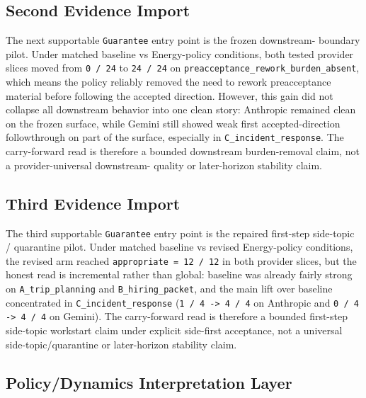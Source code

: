 \documentclass[11pt]{article}
\begin{document}
\subsection{Second Evidence Import}

The next supportable \texttt{Guarantee} entry point is the frozen downstream-
boundary pilot. Under matched baseline vs Energy-policy conditions, both tested
provider slices moved from \texttt{0 / 24} to \texttt{24 / 24} on
\texttt{preacceptance\_rework\_burden\_absent}, which means the policy reliably
removed the need to rework preacceptance material before following the accepted
direction. However, this gain did not collapse all downstream behavior into one
clean story: Anthropic remained clean on the frozen surface, while Gemini still
showed weak first accepted-direction followthrough on part of the surface,
especially in \texttt{C\_incident\_response}. The carry-forward read is therefore
a bounded downstream burden-removal claim, not a provider-universal downstream-
quality or later-horizon stability claim.

\subsection{Third Evidence Import}

The third supportable \texttt{Guarantee} entry point is the repaired first-step
side-topic / quarantine pilot. Under matched baseline vs revised Energy-policy
conditions, the revised arm reached \texttt{appropriate = 12 / 12} in both
provider slices, but the honest read is incremental rather than global:
baseline was already fairly strong on \texttt{A\_trip\_planning} and
\texttt{B\_hiring\_packet}, and the main lift over baseline concentrated in
\texttt{C\_incident\_response} (\texttt{1 / 4 -> 4 / 4} on Anthropic and
\texttt{0 / 4 -> 4 / 4} on Gemini). The carry-forward read is therefore a
bounded first-step side-topic workstart claim under explicit side-first
acceptance, not a universal side-topic/quarantine or later-horizon stability
claim.

\subsection{Policy/Dynamics Interpretation Layer}
\end{document}

